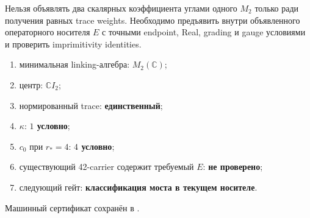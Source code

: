 \begin{nogocriterion}
Нельзя объявлять два скалярных коэффициента углами одного $M_2$ только ради
получения равных trace weights. Необходимо предъявить внутри объявленного
операторного носителя $E$ с точными endpoint, Real, grading и gauge
условиями и проверить imprimitivity identities.
\end{nogocriterion}

\begin{protocol}\begin{enumerate}
\item минимальная linking-алгебра: \textbf{$M_2(\mathbb C)$};
\item центр: \textbf{$\mathbb C I_2$};
\item нормированный trace: \textbf{единственный};
\item $\kappa$: \textbf{$1$ условно};
\item $c_0$ при $r_*=4$: \textbf{$4$ условно};
\item существующий 42-carrier содержит требуемый $E$: \textbf{не проверено};
\item следующий гейт: \textbf{классификация моста в текущем носителе}.
\end{enumerate}\end{protocol}

Машинный сертификат сохранён в
.